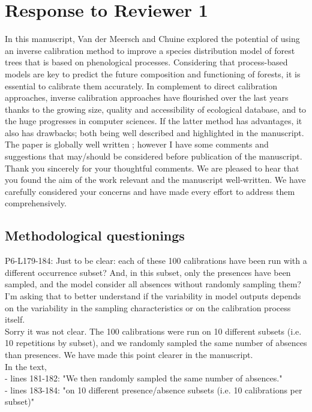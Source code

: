 \documentclass[a4paper, 11pt]{article}
\begin{document}
\section{Response to Reviewer 1}
In this manuscript, Van der Meersch and Chuine explored the potential of using an inverse calibration method to improve a species distribution model of forest trees that is based on phenological processes. Considering that process-based models are key to predict the future composition and functioning of forests, it is essential to calibrate them accurately. In complement to direct calibration approaches, inverse calibration approaches have flourished over the last years thanks to the growing size, quality and accessibility of ecological database, and to the huge progresses in computer sciences. If the latter method has advantages, it also has drawbacks; both being well described and highlighted in the manuscript. The paper is globally well written ; however I have some comments and suggestions that may/should be considered before publication of the manuscript.\\
\textcolor{customblue}{Thank you sincerely for your thoughtful comments. We are pleased to hear that you found the aim of the work relevant and the manuscript well-written. We have carefully considered your concerns and have made every effort to address them comprehensively.}\\

\subsection{Methodological questionings}

P6-L179-184: Just to be clear: each of these 100 calibrations have been run with a different occurrence subset? And, in this subset, only the presences have been sampled, and the model consider all absences without randomly sampling them? I'm asking that to better understand if the variability in model outputs depends on the variability in the sampling characteristics or on the calibration process itself. \\
\textcolor{customblue}{Sorry it was not clear. The 100 calibrations were run on 10 different subsets (i.e. 10 repetitions by subset), and we randomly sampled the same number of absences than presences. We have made this point clearer in the manuscript.}\\
In the text,\\ 
- lines 181-182: \textcolor{customred}{"We then randomly sampled the same number of absences."}\\ 
- lines 183-184: \textcolor{customred}{"on 10 different presence/absence subsets (i.e. 10 calibrations per subset)"}\\
\end{document}
